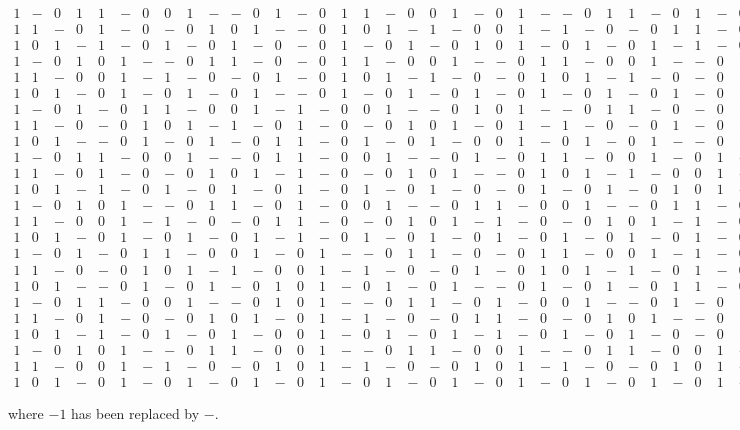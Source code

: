 \documentclass[a4paper,10pt]{article}
\begin{document}
\begin{scriptsize}
\[\begin{array}{cccccccccccccccccccccccccccccccccccccccc}
1&-&0&1&1&-&0&0&1&-&-&0&1&-&0&1&1&-&0&0&1&-&0&1&-&-&0&1&1&-&0&1&-&0&0&1&-&-&0&1\\
1&1&-&0&1&-&0&-&0&1&0&1&-&-&0&1&0&1&-&1&-&0&0&1&-&1&-&0&-&0&1&1&-&0&-&0&1&0&1&-\\
1&0&1&-&1&-&0&1&-&0&1&-&0&-&0&1&-&0&1&-&0&1&0&1&-&0&1&-&0&1&-&1&-&0&1&-&0&1&-&0\\
1&-&0&1&0&1&-&-&0&1&1&-&0&-&0&1&1&-&0&0&1&-&-&0&1&1&-&0&0&1&-&-&0&1&1&-&0&0&1&-\\
1&1&-&0&0&1&-&1&-&0&-&0&1&-&0&1&0&1&-&1&-&0&-&0&1&0&1&-&1&-&0&-&0&1&0&1&-&1&-&0\\
1&0&1&-&0&1&-&0&1&-&0&1&-&-&0&1&-&0&1&-&0&1&-&0&1&-&0&1&-&0&1&-&0&1&-&0&1&-&0&1\\
1&-&0&1&-&0&1&1&-&0&0&1&-&1&-&0&0&1&-&-&0&1&0&1&-&-&0&1&1&-&0&-&0&1&1&-&0&0&1&-\\
1&1&-&0&-&0&1&0&1&-&1&-&0&1&-&0&-&0&1&0&1&-&0&1&-&1&-&0&-&0&1&-&0&1&0&1&-&1&-&0\\
1&0&1&-&-&0&1&-&0&1&-&0&1&1&-&0&1&-&0&1&-&0&0&1&-&0&1&-&0&1&-&-&0&1&-&0&1&-&0&1\\
1&-&0&1&1&-&0&0&1&-&-&0&1&1&-&0&0&1&-&-&0&1&-&0&1&1&-&0&0&1&-&0&1&-&-&0&1&1&-&0\\
1&1&-&0&1&-&0&-&0&1&0&1&-&1&-&0&-&0&1&0&1&-&-&0&1&0&1&-&1&-&0&0&1&-&1&-&0&-&0&1\\
1&0&1&-&1&-&0&1&-&0&1&-&0&1&-&0&1&-&0&1&-&0&-&0&1&-&0&1&-&0&1&0&1&-&0&1&-&0&1&-\\
1&-&0&1&0&1&-&-&0&1&1&-&0&1&-&0&0&1&-&-&0&1&1&-&0&0&1&-&-&0&1&1&-&0&0&1&-&-&0&1\\
1&1&-&0&0&1&-&1&-&0&-&0&1&1&-&0&-&0&1&0&1&-&1&-&0&-&0&1&0&1&-&1&-&0&-&0&1&0&1&-\\
1&0&1&-&0&1&-&0&1&-&0&1&-&1&-&0&1&-&0&1&-&0&1&-&0&1&-&0&1&-&0&1&-&0&1&-&0&1&-&0\\
1&-&0&1&-&0&1&1&-&0&0&1&-&0&1&-&-&0&1&1&-&0&-&0&1&1&-&0&0&1&-&1&-&0&0&1&-&-&0&1\\
1&1&-&0&-&0&1&0&1&-&1&-&0&0&1&-&1&-&0&-&0&1&-&0&1&0&1&-&1&-&0&1&-&0&-&0&1&0&1&-\\
1&0&1&-&-&0&1&-&0&1&-&0&1&0&1&-&0&1&-&0&1&-&-&0&1&-&0&1&-&0&1&1&-&0&1&-&0&1&-&0\\
1&-&0&1&1&-&0&0&1&-&-&0&1&0&1&-&-&0&1&1&-&0&1&-&0&0&1&-&-&0&1&-&0&1&1&-&0&0&1&-\\
1&1&-&0&1&-&0&-&0&1&0&1&-&0&1&-&1&-&0&-&0&1&1&-&0&-&0&1&0&1&-&-&0&1&0&1&-&1&-&0\\
1&0&1&-&1&-&0&1&-&0&1&-&0&0&1&-&0&1&-&0&1&-&1&-&0&1&-&0&1&-&0&-&0&1&-&0&1&-&0&1\\
1&-&0&1&0&1&-&-&0&1&1&-&0&0&1&-&-&0&1&1&-&0&0&1&-&-&0&1&1&-&0&0&1&-&-&0&1&1&-&0\\
1&1&-&0&0&1&-&1&-&0&-&0&1&0&1&-&1&-&0&-&0&1&0&1&-&1&-&0&-&0&1&0&1&-&1&-&0&-&0&1\\
1&0&1&-&0&1&-&0&1&-&0&1&-&0&1&-&0&1&-&0&1&-&0&1&-&0&1&-&0&1&-&0&1&-&0&1&-&0&1&-
 \end{array},
\]
\end{scriptsize}
where $-1$ has been replaced by $-$.
\end{document}
